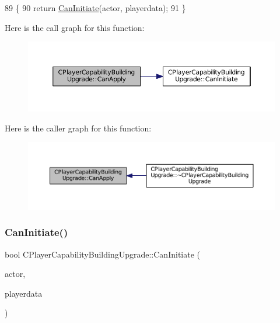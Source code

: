 \begin{DoxyCode}
89                                                                                                            
                                                            \{
90     \textcolor{keywordflow}{return} \hyperlink{classCPlayerCapabilityBuildingUpgrade_af515cec6f1a28607864c853307e17d7c}{CanInitiate}(actor, playerdata);
91 \}
\end{DoxyCode}
Here is the call graph for this function\+:\nopagebreak
\begin{figure}[H]
\begin{center}
\leavevmode
\includegraphics[width=350pt]{classCPlayerCapabilityBuildingUpgrade_a22de7902bcf6406a3b3a7c51e5c56f35_cgraph}
\end{center}
\end{figure}
Here is the caller graph for this function\+:\nopagebreak
\begin{figure}[H]
\begin{center}
\leavevmode
\includegraphics[width=350pt]{classCPlayerCapabilityBuildingUpgrade_a22de7902bcf6406a3b3a7c51e5c56f35_icgraph}
\end{center}
\end{figure}
\hypertarget{classCPlayerCapabilityBuildingUpgrade_af515cec6f1a28607864c853307e17d7c}{}\label{classCPlayerCapabilityBuildingUpgrade_af515cec6f1a28607864c853307e17d7c} 
\subsubsection{\texorpdfstring{Can\+Initiate()}{CanInitiate()}}
{\footnotesize\ttfamily bool C\+Player\+Capability\+Building\+Upgrade\+::\+Can\+Initiate (\begin{DoxyParamCaption}\item[{std\+::shared\+\_\+ptr$<$ \hyperlink{classCPlayerAsset}{C\+Player\+Asset} $>$}]{actor,  }\item[{std\+::shared\+\_\+ptr$<$ \hyperlink{classCPlayerData}{C\+Player\+Data} $>$}]{playerdata }\end{DoxyParamCaption})\hspace{0.3cm}{\ttfamily [virtual]}}



